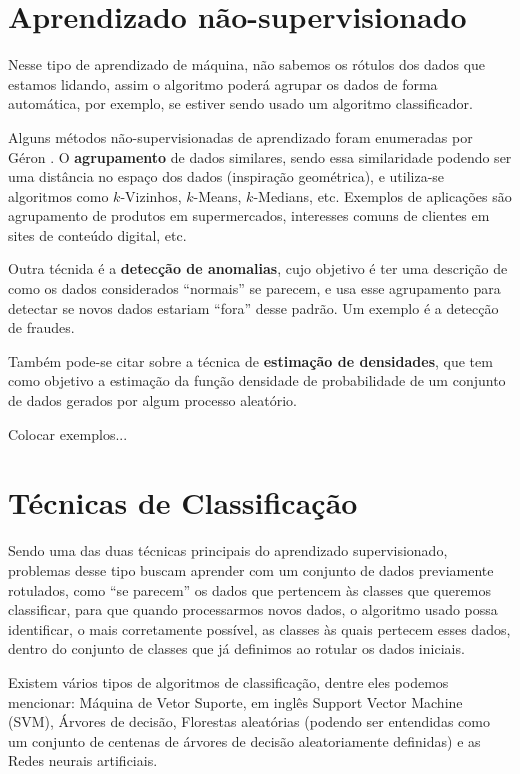 \section{Aprendizado não-supervisionado}

Nesse tipo de aprendizado de máquina, não sabemos os rótulos dos dados que estamos lidando, assim o algoritmo poderá agrupar os dados de forma automática, por exemplo, se estiver sendo usado um algoritmo classificador.

Alguns métodos não-supervisionadas de aprendizado foram enumeradas por Géron \citep{hands}. O \textbf{agrupamento} de dados similares, sendo essa similaridade podendo ser uma distância no espaço dos dados (inspiração geométrica), e utiliza-se algoritmos como $k$-Vizinhos, $k$-Means, $k$-Medians, etc. Exemplos de aplicações são agrupamento de produtos em supermercados, interesses comuns de clientes em sites de conteúdo digital, etc.

Outra técnida é a \textbf{detecção de anomalias}, cujo objetivo é ter uma descrição de como os dados considerados ``normais'' se parecem, e usa esse agrupamento para detectar se novos dados estariam ``fora'' desse padrão. Um exemplo é a detecção de fraudes.

Também pode-se citar sobre a técnica de \textbf{estimação de densidades}, que tem como objetivo a estimação da função densidade de probabilidade de um conjunto de dados gerados por algum processo aleatório.

Colocar exemplos...

\section{Técnicas de Classificação}

Sendo uma das duas técnicas principais do aprendizado supervisionado, problemas desse tipo buscam aprender com um conjunto de dados previamente rotulados, como ``se parecem'' os dados que pertencem às classes que queremos classificar, para que quando processarmos novos dados, o algoritmo usado possa identificar, o mais corretamente possível, as classes às quais pertecem esses dados, dentro do conjunto de classes que já definimos ao rotular os dados iniciais.

Existem vários tipos de algoritmos de classificação, dentre eles podemos mencionar: Máquina de Vetor Suporte, em inglês Support Vector Machine (SVM), Árvores de decisão, Florestas aleatórias (podendo ser entendidas como um conjunto de centenas de árvores de decisão aleatoriamente definidas) e as Redes neurais artificiais.


